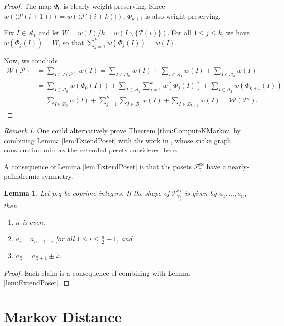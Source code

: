 \documentclass[12pt, letterpaper,table]{amsart}
\newtheorem{lemma}[theorem]{Lemma}
\theoremstyle{remark}
\newtheorem{remark}[theorem]{Remark}
\newcommand{\fpq}{\frac{p}{q}}
\newcommand{\calP}{\mathcal{P}}
\newcommand{\calA}{\mathcal{A}}
\newcommand{\calB}{\mathcal{B}}
\newcommand{\exx}{\mathrm{ex}}
\newcommand{\wt}{w}
\begin{document}
\begin{proof}
The map $\Phi_0$ is clearly weight-preserving. Since $\wt(\langle\calP(i+1)\rangle) = \wt(\langle\calP'(i+k)\rangle)$, $\Phi_{k+1}$ is also weight-preserving.

Fix $I \in \calA_1$ and let $W = \wt(I) /k = \wt(I \backslash \{\calP(i)\})$. For all $1 \leq j \leq k$, we have $\wt(\Phi_j(I)) = W$, so that $\sum_{j=1}^k \wt(\Phi_j(I)) = \wt(I)$.

Now, we conclude \begin{align*}
\mathcal{W}(\calP) &= \sum_{I \in J(\calP)} \wt(I) = \sum_{I \in \calA_0} \wt(I) +\sum_{I \in \calA_1} \wt(I) +\sum_{I \in \calA_2} \wt(I) \\
& = \sum_{I \in \calA_0} \wt(\Phi_0(I)) +\sum_{I \in \calA_1} \sum_{j=1}^k \wt(\Phi_j(I)) +\sum_{I \in \calA_2} \wt(\Phi_{k+1}(I))\\
&= \sum_{I \in \calB_0} \wt(I) + \sum_{j=1}^k \sum_{I \in \calB_j} \wt(I) + \sum_{I \in \calB_{k+1}} \wt(I) = \mathcal{W}(\calP').
\end{align*}
\end{proof}

\begin{remark}
One could alternatively prove Theorem \ref{thm:ComputeKMarkov} by combining Lemma \ref{lem:ExtendPoset} with the work in \cite{gyoda2024sl}, whose snake graph construction mirrors the extended posets considered here.
\end{remark}


A consequence of Lemma \ref{lem:ExtendPoset} is that the posets $\calP_\gamma^\exx$ have a nearly-palindromic symmetry. 

\begin{lemma}\label{lem:NearPalindrome}
Let $p,q$ be coprime integers. If the shape of $\calP^\exx_{\gamma_\fpq}$ is given by $a_1,\ldots,a_n$, then \begin{enumerate}
\item $n$ is even,
\item $a_i = a_{n+1-i}$ for all $1 \leq i \leq \frac{n}{2}-1$, and
\item $a_{\frac{n}{2}} = a_{\frac{n}{2}+1} \pm k$. 
\end{enumerate}
\end{lemma}

\begin{proof}
Each claim is a consequence of combining \cite[Lemma 8.21]{BG} with Lemma \ref{lem:ExtendPoset}.
\end{proof}

\section{Markov Distance}\label{sec:MarkovDistance}
\end{document}
